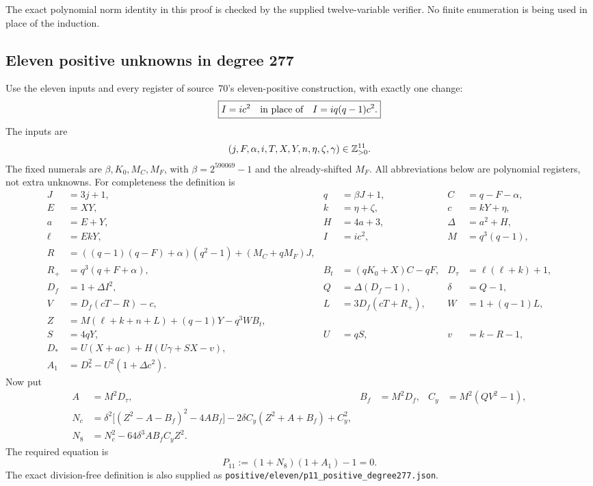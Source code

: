 The exact polynomial norm identity in this proof is checked by the supplied
twelve-variable verifier. No finite enumeration is being used in place of
the induction.

\subsection{Eleven positive unknowns in degree 277}

Use the eleven inputs and every register of source~70's eleven-positive
construction\cite{source70}, with exactly one change:
\[
 \boxed{I=ic^2\quad\hbox{in place of}\quad I=iq(q-1)c^2.}
\]
The inputs are
\[
 (j,F,\alpha,i,T,X,Y,n,\eta,\zeta,\gamma)\in\mathbb Z_{>0}^{11}.
\]
The fixed numerals are $\beta,K_0,M_C,M_F$, with
$\beta=2^{590069}-1$ and the already-shifted $M_F$.
All abbreviations below are polynomial registers, not extra unknowns.
For completeness the definition is
\begin{align*}
 J&=3j+1,&q&=\beta J+1,&C&=q-F-\alpha,\\
 E&=XY,&k&=\eta+\zeta,&c&=kY+\eta,\\
 a&=E+Y,&H&=4a+3,&\Delta&=a^2+H,\\
 \ell&=EkY,&I&=ic^2,&M&=q^3(q-1),\\
 R&=((q-1)(q-F)+\alpha)(q^2-1)+(M_C+qM_F)J,\\
 R_+&=q^3(q+F+\alpha),&
 B_t&=(qK_0+X)C-qF,&D_\tau&=\ell(\ell+k)+1,\\
 D_f&=1+\Delta I^2,&Q&=\Delta(D_f-1),&\delta&=Q-1,\\
 V&=D_f(cT-R)-c,&L&=3D_f(cT+R_+),&W&=1+(q-1)L,\\
 Z&=M(\ell+k+n+L)+(q-1)Y-q^3WB_t,\\
 S&=4qY,&U&=qS,&v&=k-R-1,\\
 D_*&=U(X+ac)+H(U\gamma+SX-v),\\
 A_1&=D_*^2-U^2(1+\Delta c^2).
\end{align*}
Now put
\begin{align*}
 A&=M^2D_\tau,&B_f&=M^2D_f,&C_y&=M^2(QV^2-1),\\
 N_c&=\delta^2\bigl[(Z^2-A-B_f)^2-4AB_f\bigr]
       -2\delta C_y(Z^2+A+B_f)+C_y^2,\\
 N_8&=N_c^2-64\delta^3AB_fC_yZ^2.
\end{align*}
The required equation is
\begin{equation}
 \boxed{P_{11}:=(1+N_8)(1+A_1)-1=0.}
 \label{eq:positive277}
\end{equation}
The exact division-free definition is also supplied as
\texttt{positive/eleven/p11\_positive\_degree277.json}.


